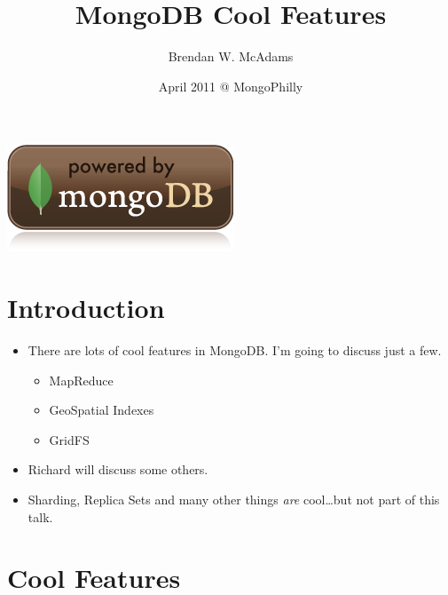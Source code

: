 \documentclass[xcolor=dvipsnames]{beamer}
\title{MongoDB Cool Features} %
\institute[10gen, Inc.]{10gen, Inc.}
\author[B.W. McAdams]{Brendan W. McAdams}
\date{April 2011 @ MongoPhilly}
\newenvironment{itemizeframe}
               {\begin{frame}\startitemizeframe} 
               {\stopitemizeframe\end{frame}}
\newcommand\startitemizeframe{\begin{itemize}} \newcommand\stopitemizeframe{\end{itemize}}
\begin{document}
\begin{frame}
  \titlepage
  \begin{center}
  \includegraphics[scale=0.25]{images/powered_mongo.png}
  \end{center}
\end{frame}

\section{Introduction}

\begin{itemizeframe}
        \frametitle{Cool Features?}
        \item There are lots of cool features in MongoDB.  I'm going to discuss just a few.
            \begin{itemize}
                \item MapReduce
                \item GeoSpatial Indexes
                \item GridFS
            \end{itemize}
        \item Richard will discuss some others.  
        \item Sharding, Replica Sets and many other things {\em are} cool\ldots but not part of this talk.
\end{itemizeframe}

\section{Cool Features}
\end{document}
